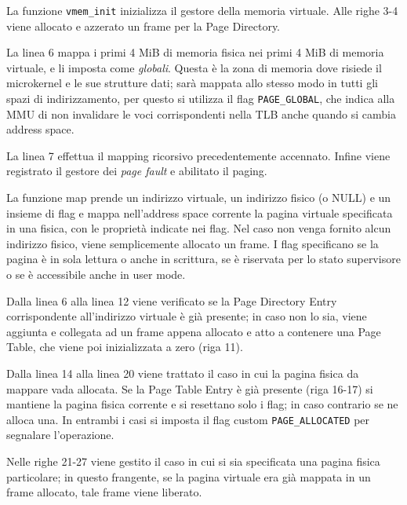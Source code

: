 \documentclass[12pt,a4paper]{report}
\begin{document}
			
			
			La funzione \texttt{vmem\_init} inizializza il gestore della memoria virtuale.
			Alle righe 3-4 viene allocato e azzerato un frame per la Page Directory.
			
			La linea 6 mappa i primi 4 MiB di memoria fisica nei primi 4 MiB di memoria virtuale, e li imposta come \emph{globali}.
			Questa è la zona di memoria dove risiede il microkernel e le sue strutture dati; sarà mappata allo stesso modo in tutti
			gli spazi di indirizzamento, per questo si utilizza il flag \texttt{PAGE\_GLOBAL}, che indica alla MMU di non invalidare le voci
			corrispondenti nella TLB anche quando si cambia address space.
			
			La linea 7 effettua il mapping ricorsivo precedentemente accennato.
			Infine viene registrato il gestore dei \emph{page fault} e abilitato il paging.
			
			
			
			La funzione map prende un indirizzo virtuale, un indirizzo fisico (o NULL) e un insieme di flag
			e mappa nell'address space corrente la pagina virtuale specificata in una fisica, con le proprietà
			indicate nei flag.
			Nel caso non venga fornito alcun indirizzo fisico, viene semplicemente allocato un frame.
			I flag specificano se la pagina è in sola lettura o anche in scrittura, se è
			riservata per lo stato supervisore o se è accessibile anche in user mode.
			
			Dalla linea 6 alla linea 12 viene verificato se la Page Directory Entry corrispondente
			all'indirizzo virtuale è già presente; in caso non lo sia, viene aggiunta e collegata ad
			un frame appena allocato e atto a contenere una Page Table, che viene poi inizializzata a zero (riga 11).
			
			Dalla linea 14 alla linea 20 viene trattato il caso in cui la pagina fisica da mappare vada allocata.
			Se la Page Table Entry è già presente (riga 16-17) si mantiene la pagina fisica corrente e si
			resettano solo i flag; in caso contrario se ne alloca una. In entrambi i casi si imposta il flag custom
			\texttt{PAGE\_ALLOCATED} per segnalare l'operazione.
			
			Nelle righe 21-27 viene gestito il caso in cui si sia specificata una pagina fisica particolare;
			in questo frangente, se la pagina virtuale era già mappata in un frame allocato, tale frame
			viene liberato.
			
\end{document}
